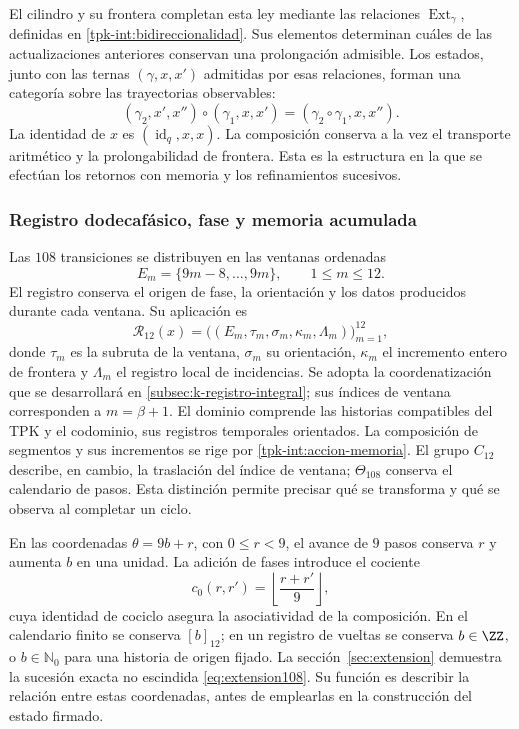 El cilindro y su frontera completan esta ley mediante las relaciones
\(\operatorname{Ext}_\gamma\), definidas en
\ref{tpk-int:bidireccionalidad}. Sus elementos determinan cuáles de
las actualizaciones anteriores conservan una prolongación admisible.
Los estados, junto con las ternas \((\gamma,x,x')\) admitidas por
esas relaciones, forman una categoría sobre las trayectorias observables:
\[
 (\gamma_2,x',x'')\circ(\gamma_1,x,x')
     =(\gamma_2\circ\gamma_1,x,x'').
\]
La identidad de \(x\) es \((\operatorname{id}_q,x,x)\).
La composición conserva a la vez el transporte aritmético y la
prolongabilidad de frontera. Esta es la estructura en la que se efectúan
los retornos con memoria y los refinamientos sucesivos.

\subsubsection{Registro dodecafásico, fase y memoria acumulada}
\label{tpk-int:dodecafase}

Las \(108\) transiciones se distribuyen en las ventanas ordenadas
\[
 E_m=\{9m-8,\ldots,9m\},\qquad 1\leq m\leq12.
\]
El registro conserva el origen de fase, la orientación y los datos
producidos durante cada ventana. Su aplicación es
\[
 \mathcal R_{12}(x)=
 \bigl((E_m,\tau_m,\sigma_m,\kappa_m,\Lambda_m)\bigr)_{m=1}^{12},
\]
donde \(\tau_m\) es la subruta de la ventana, \(\sigma_m\) su
orientación, \(\kappa_m\) el incremento entero de frontera y
\(\Lambda_m\) el registro local de incidencias. Se adopta la coordenatización
que se desarrollará en \ref{subsec:k-registro-integral}; sus índices
de ventana corresponden a \(m=\beta+1\).
El dominio comprende las historias compatibles
del TPK y el codominio, sus registros temporales orientados. La
composición de segmentos y sus incrementos se rige por
\eqref{tpk-int:accion-memoria}. El grupo \(C_{12}\) describe, en
cambio, la traslación del índice de ventana; \(\Theta_{108}\) conserva
el calendario de pasos. Esta distinción permite precisar qué se transforma
y qué se observa al completar un ciclo.

En las coordenadas \(\theta=9b+r\), con \(0\leq r<9\), el avance
de \(9\) pasos conserva \(r\) y aumenta \(b\) en una unidad.
La adición de fases introduce el cociente
\[
 c_0(r,r')=\left\lfloor\frac{r+r'}9\right\rfloor,
\]
cuya identidad de cociclo asegura la asociatividad de la composición.
En el calendario finito se conserva \([b]_{12}\); en un registro de
vueltas se conserva \(b\in\ZZ\), o \(b\in\mathbb N_0\) para
una historia de origen fijado. La sección~\ref{sec:extension} demuestra
la sucesión exacta no escindida \eqref{eq:extension108}. Su función es
describir la relación entre estas coordenadas, antes de emplearlas en la
construcción del estado firmado.


